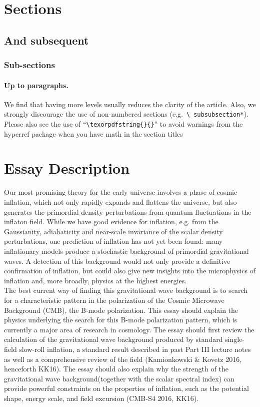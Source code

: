 \documentclass[a4paper,11pt]{article}
\begin{document}
\section{Sections}
\subsection{And subsequent}
\subsubsection{Sub-sections}
\paragraph{Up to paragraphs.} We find that having more levels usually
reduces the clarity of the article. Also, we strongly discourage the
use of non-numbered sections (e.g.~\texttt{\textbackslash
  subsubsection*}).  Please also see the use of
``\texttt{\textbackslash texorpdfstring\{\}\{\}}'' to avoid warnings
from the hyperref package when you have math in the section titles



\appendix
\section{Essay Description}
Our most promising theory for the early universe involves a phase of cosmic inflation, which not only rapidly expands and flattens the universe, but also generates the primordial density perturbations from quantum fluctuations in the inflaton field. While we have good evidence for inflation, e.g. from the Gaussianity, adiabaticity and near-scale invariance of the scalar density perturbations, one prediction of inflation has not yet been found: many inflationary models produce a stochastic background of primordial gravitational waves. A detection of this background would not only provide a definitive confirmation of inflation, but could also give new insights into the microphysics of inflation and, more broadly, physics at the highest energies.\\

The best current way of finding this gravitational wave background is to search for a characteristic pattern in the polarization of the Cosmic Microwave Background (CMB), the B-mode polarization. This essay should explain the physics underlying the search for this B-mode polarization pattern, which is currently a major area of research in cosmology.
The essay should first review the calculation of the gravitational wave background produced
by standard single-field slow-roll inflation, a standard result described in past Part III lecture notes as well as a comprehensive review of the field (Kamionkowski \& Kovetz 2016, henceforth KK16). The essay should also explain why the strength of the gravitational wave background(together with the scalar spectral index) can provide powerful constraints on the properties of inflation, such as the potential shape, energy scale, and field excursion (CMB-S4 2016, KK16).\\
\end{document}
